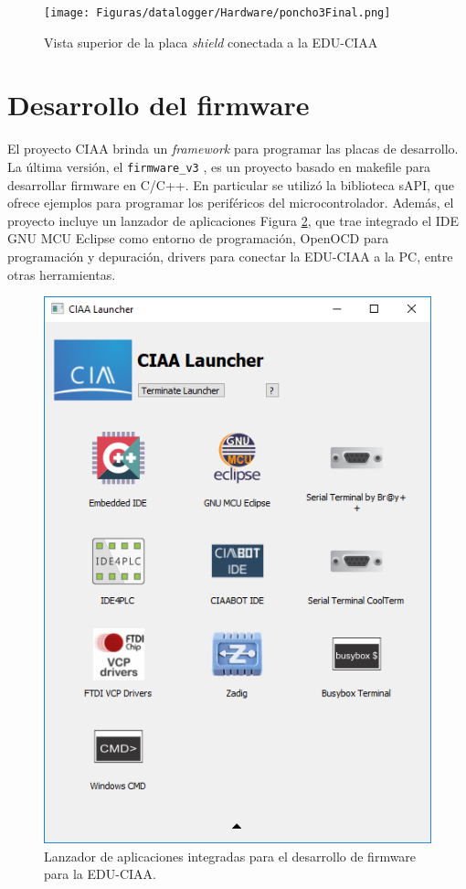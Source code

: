 


\begin{figure}[H]
    \centering
    \texttt{[image: Figuras/datalogger/Hardware/poncho3Final.png]}
    \caption{Vista superior de la placa \textit{shield} conectada a la EDU-CIAA}
    \label{fig:poncho3Final}
\end{figure}

\section{Desarrollo del firmware}\label{sec:desarrolloFirmware}

El proyecto CIAA brinda un \textit{framework} para programar las placas de desarrollo. La última versión, el \texttt{firmware\_v3} \cite{ciaa2024}, es un proyecto basado en makefile para desarrollar firmware en C/C++. En particular se utilizó la biblioteca sAPI, que ofrece ejemplos para programar los periféricos del microcontrolador. Además, el proyecto incluye un lanzador de aplicaciones Figura \ref{fig:ciaaLauncher}, que trae integrado el IDE GNU MCU Eclipse como entorno de programación, OpenOCD para programación y depuración, drivers para conectar la EDU-CIAA a la PC, entre otras herramientas. 

\begin{figure}[H]
    \centering
    \includegraphics[width=0.3\linewidth]{Figuras/datalogger/Firmware/ciaaLauncher.png}
    \caption{Lanzador de aplicaciones integradas para el desarrollo de firmware para la EDU-CIAA.}
    \label{fig:ciaaLauncher}
\end{figure}


